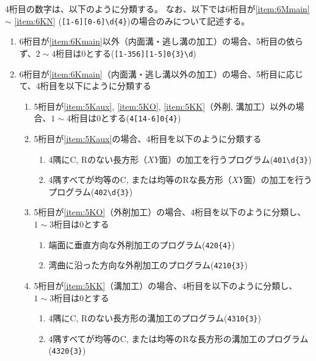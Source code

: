 4桁目の数字は、以下のように分類する。
なお、以下では6桁目が\ref{item:6Mmain} $\sim$ \ref{item:6KN} (\verb|[1-6][0-6]\d{4}|)の場合のみについて記述する。
\begin{enumerate}[label=\alph*), ref=\alph*)]
\item 6桁目が\ref{item:6Kmain}\hx 以外（内面溝・逃し溝の加工）の場合、5桁目の依らず、$2\sim4$桁目は0とする(\verb|[1-356][1-5]0{3}\d|)
\item 6桁目が\ref{item:6Kmain}（内面溝・逃し溝以外の加工）の場合、5桁目に応じて、4桁目を以下にように分類する
  \begin{enumerate}[label=\alph{enumi}\,-\arabic*), leftmargin=\leftmargini]
  \item 5桁目が\ref{item:5Kaux}, \ref{item:5KO}, \ref{item:5KK}（外削, 溝加工）以外の場合、$1\sim4$桁目は0とする(\verb|4[14-6]0{4}|)
  \item 5桁目が\ref{item:5Kaux}\hx の場合、4桁目を以下のように分類する
    \begin{enumerate}[label=\arabic*., ref=\arabic*, start=1, leftmargin=*]
    \item 4隅にC, Rのない長方形（$XY$面）の加工を行うプログラム(\verb|401\d{3}|)
    \item 4隅すべてが均等のC, または均等のRな長方形（$XY$面）の加工を行うプログラム(\verb|402\d{3}|)
    \end{enumerate}
  \item 5桁目が\ref{item:5KO}（外削加工）の場合、4桁目を以下のように分類し、$1\sim3$桁目は0とする
    \begin{enumerate}[label=\arabic*., ref=\arabic*, start=0, leftmargin=*]
    \item 端面に垂直方向な外削加工のプログラム(\verb|420{4}|)
    \item 湾曲に沿った方向な外削加工のプログラム(\verb|4210{3}|)
    \end{enumerate}
  \item 5桁目が\ref{item:5KK}（溝加工）の場合、4桁目を以下のように分類し、$1\sim3$桁目は0とする
    \begin{enumerate}[label=\arabic*., ref=\arabic*, leftmargin=*]
    \item\label{item:4Krec} 4隅にC, Rのない長方形の溝加工のプログラム(\verb|4310{3}|)
    \item\label{item:4Kcorner} 4隅すべてが均等のC, または均等のRな長方形の溝加工のプログラム(\verb|4320{3}|)
    \end{enumerate}
  \end{enumerate}
\end{enumerate}



